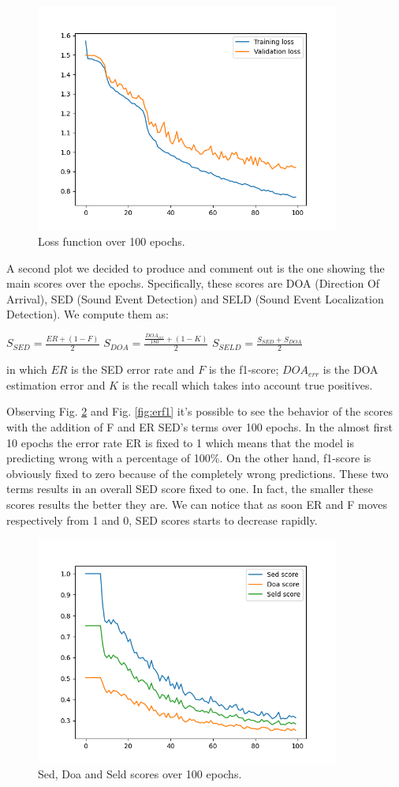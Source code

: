 \documentclass[11pt]{article}
\begin{document}
\begin{figure}[h!]
	\centering
	\includegraphics[width=10cm]{img/loss.png}
	\caption{Loss function over 100 epochs.}
	\label{fig:loss}
\end{figure}

\noindent
A second plot we decided to produce and comment out is the one showing the main scores over the epochs. Specifically, these scores are DOA (Direction Of Arrival), SED (Sound Event Detection) and SELD (Sound Event Localization Detection). We compute them as:

$S_{SED} = \frac{ER + (1-F)}{2}$ \space\space
$S_{DOA} = \frac{\frac{DOA_{err}}{180} + (1-K)}{2}$ \space\space
$S_{SELD} = \frac{S_{SED} + S_{DOA}}{2}$ \space\space

\noindent
in which $ER$ is the SED error rate and $F$ is the f1-score; $DOA_{err}$ is the DOA estimation error and $K$ is the recall which takes into account true positives.

Observing Fig. \ref{fig:scores} and Fig. \ref{fig:erf1} it's possible to see the behavior of the scores with the addition of F and ER SED's terms over 100 epochs. In the almost first 10 epochs the error rate ER is fixed to 1 which means that the model is predicting wrong with a percentage of 100\%. On the other hand, f1-score is obviously fixed to zero because of the completely wrong predictions. These two terms results in an overall SED score fixed to one. In fact, the smaller these scores results the better they are. We can notice that as soon ER and F moves respectively from 1 and 0, SED scores starts to decrease rapidly.

\begin{figure}[h!]
	\centering
	\includegraphics[width=10cm]{img/scores.png}
	\caption{Sed, Doa and Seld scores over 100 epochs.}
	\label{fig:scores}
\end{figure}
\end{document}
